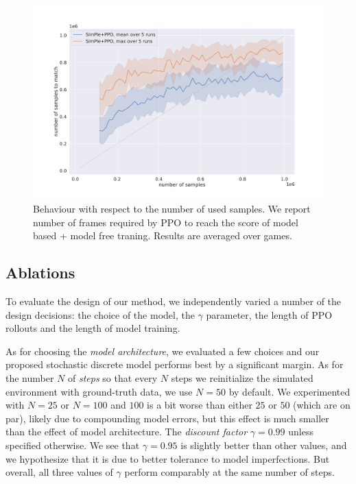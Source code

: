 \begin{figure}
	\includegraphics[width = \mywidth]{figures/number_of_step_simple_ppo.pdf}
	\caption{Behaviour with respect to the number of used samples. We report number of frames required by PPO to reach the score of model based + model free traning. Results are averaged over games.\label{fig:numberOfStepsSimplePPO}}
\end{figure}



\subsection{Ablations}\label{sec:ablations}

To evaluate the design of our method, we independently varied a number of the design decisions: the choice of the model, the $\gamma$ parameter, the length of PPO rollouts and the length of model training.

As for choosing the \emph{model architecture}, we evaluated a few choices and our proposed stochastic discrete model performs best by a significant margin.
As for the number $N$ of \emph{steps} so that every $N$ steps we reinitialize the simulated environment with ground-truth data, we use $N=50$ by default. We experimented with $N=25$ or $N=100$ and $100$ is a bit worse than either $25$ or $50$ (which are on par), likely due to compounding model errors, but this effect is much smaller than the effect of model architecture. The \emph{discount factor} $\gamma=0.99$ unless specified otherwise.  We see that $\gamma=0.95$ is slightly better than other values, and we hypothesize that it is due to better tolerance to model imperfections. But overall, all three values of $\gamma$ perform comparably at the same number of steps.

